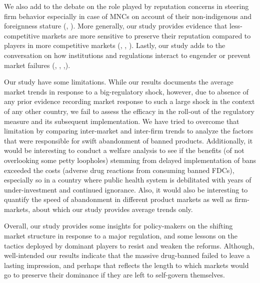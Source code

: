 \documentclass[AER]{AEA}
\theoremstyle{theorem}
\begin{document}
We also add to the debate on the role played by reputation concerns in steering firm behavior especially in case of MNCs on account of their non-indigenous and foreignness stature (\cite{zaheer1997dynamics}, \cite{rhee2006liability}). More generally, our study provides evidence that less-competitive markets are more sensitive to preserve their reputation compared to players in more competitive markets (\cite{prager1990firm}, \cite{bouvard2018two}, \cite{rasmusen2011monopoly}). Lastly, our study adds to the conversation on how institutions and regulations interact to engender or prevent market failures (\cite{cherry2013enforcing}, \cite{breen2012corruption}, \cite{moshirian2011global},\cite{strauss1998strong}).

Our study have some limitations. While our results documents the average market trends in response to a big-regulatory shock, however, due to absence of any prior evidence recording market response to such a large shock in the context of any other country, we fail to assess the efficacy in the roll-out of the regulatory measure and its subsequent implementation. We have tried to overcome that limitation by comparing inter-market and inter-firm trends to analyze the factors that were responsible for swift abandonment of banned products. Additionally, it would be interesting to conduct a welfare analysis to see if the benefits (of not overlooking some petty loopholes) stemming from delayed implementation of bans exceeded the costs (adverse drug reactions from consuming banned FDCs), especially so in a country where public health system is debilitated with years of under-investment and continued ignorance. Also, it would also be interesting to quantify the speed of abandonment in different product markets as well as firm-markets, about which our study provides average trends only.

Overall, our study provides some insights for policy-makers on the shifting market structure in response to a major regulation, and some lessons on the tactics deployed by dominant players to resist and weaken the reforms. Although, well-intended our results indicate that the massive drug-banned failed to leave a lasting impression, and perhaps that reflects the length to which  markets would go to preserve their dominance if they are left to self-govern themselves.

\end{document}
